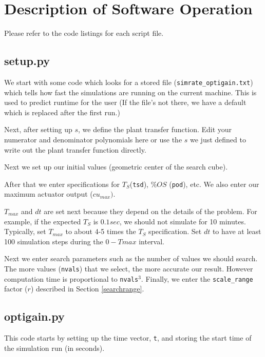 \section{Description of Software Operation}

Please refer to the code listings for each script file.

\subsection{setup.py}

We start with some code which looks for a stored file ({\tt simrate\_optigain.txt}) which tells how fast
the simulations are running on the current machine.  This is used to predict runtime for the user (If the file's
not there, we have a default which is replaced after the first run.)

Next, after setting up $s$, we define the plant transfer function.  Edit your numerator and denominator polynomials here or use the $s$ we just defined
to write out the plant transfer function directly.

Next we set up our initial values (geometric center of the search cube).

After that
we enter specifications for $T_S$({\tt tsd}), $\%OS$ ({\tt pod}), etc.   We also enter our maximum actuator output ($cu_{max})$.


$T_{max}$ and $dt$ are set next because they depend on the details of the problem.  For example, if
the expected $T_S$ is $0.1sec$, we should not simulate for 10 minutes.   Typically, set
$T_{max}$ to about 4-5 times the $T_S$ specification.   Set $dt$ to have at least 100 simulation
steps during the $0-T{max}$ interval.


Next we enter search parameters such as the  number of values we should search.  The more values ({\tt nvals}) that we select, the more accurate our result.  However computation time is proportional to {\tt nvals}$^3$.
Finally, we  enter the {\tt scale\_range} factor ($r$) described in Section \ref{searchrange}.



\subsection{optigain.py}
This code starts by setting up the time vector, {\tt t}, and storing the start time of the simulation run (in seconds).

